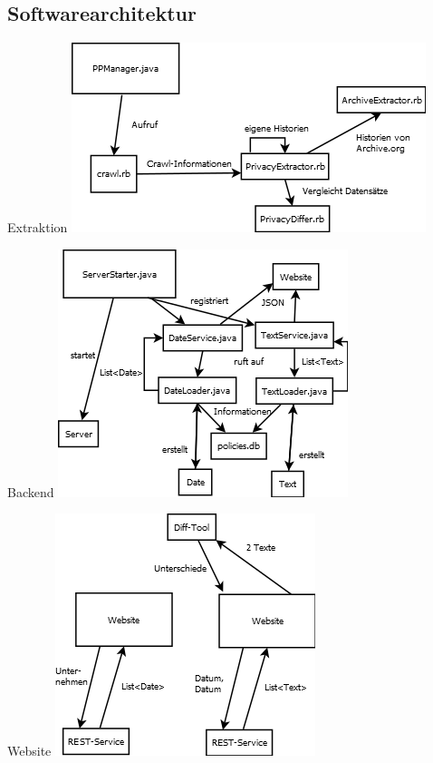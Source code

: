 \documentclass[halfparskip]{beamer}
\begin{document}
\subsection{Softwarearchitektur}
\begin{frame}{Extraktion}
	\centering
	\includegraphics[scale=0.75]{extraction.png}
\end{frame}
\begin{frame}{Backend}
	\centering
	\includegraphics[scale=0.75]{backend.png}
\end{frame}
\begin{frame}{Website}
	\centering
	\includegraphics[scale=0.75]{frontend.png}
\end{frame}
\end{document}
